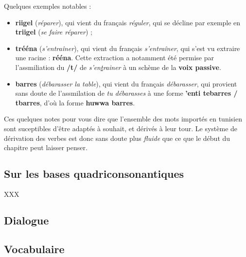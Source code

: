 Quelques exemples notables : 
\begin{itemize}
    \item \textbf{riigel} (\textit{réparer}), qui vient du français \textit{réguler}, qui se décline par exemple en \textbf{triigel} (\textit{se faire réparer}) ;
    \item \textbf{trééna} (\textit{s'entraîner}), qui vient du français \textit{s'entraîner}, qui s'est vu extraire une racine : \textbf{rééna}. Cette extraction a notamment été permise par l'assmiliation du \textbf{/t/} de \textit{s'en\underline{t}rainer} à un schème de la \textbf{voix passive}.
    \item \textbf{barres} (\textit{débarasser la table}), qui vient du français \textit{débarasser}, qui provient sans doute de l'assmilation de \textit{tu débarasses} à une forme \textbf{'enti tebarres / tbarres}, d'où la forme \textbf{huwwa barres}.
\end{itemize}

Ces quelques notes pour vous dire que l'ensemble des mots importés en tunisien sont suceptibles d'être adaptés à souhait, et dérivés à leur tour. Le système de dérivation des verbes est donc sans doute plus \textit{fluide} que ce que le début du chapitre peut laisser penser.

\subsection{Sur les bases quadriconsonantiques}
XXX

\subsection*{Dialogue}
\subsection*{Vocabulaire}